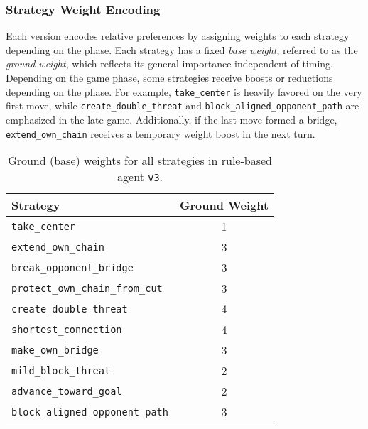 \documentclass[conference]{IEEEtran}
\begin{document}
\subsubsection{Strategy Weight Encoding}
Each version encodes relative preferences by assigning weights to each strategy depending on the phase. Each strategy has a fixed \textit{base weight}, referred to as the \textit{ground weight}, which reflects its general importance independent of timing. \\
Depending on the game phase, some strategies receive boosts or reductions depending on the phase. For example, \texttt{take\_center} is heavily favored on the very first move, while \texttt{create\_double\_threat} and \texttt{block\_aligned\_opponent\_path} are emphasized in the late game. Additionally, if the last move formed a bridge, \texttt{extend\_own\_chain} receives a temporary weight boost in the next turn.
\begin{table}[htbp]
\caption{Ground (base) weights for all strategies in rule-based agent \texttt{v3}.}
\begin{center}
\begin{tabular}{|l|c|}
\hline
\textbf{Strategy} & \textbf{Ground Weight} \\
\hline
\texttt{take\_center}                   & 1  \\
\texttt{extend\_own\_chain}             & 3  \\
\texttt{break\_opponent\_bridge}        & 3  \\
\texttt{protect\_own\_chain\_from\_cut} & 3  \\
\texttt{create\_double\_threat}         & 4  \\
\texttt{shortest\_connection}           & 4  \\
\texttt{make\_own\_bridge}              & 3  \\
\texttt{mild\_block\_threat}            & 2  \\
\texttt{advance\_toward\_goal}          & 2  \\
\texttt{block\_aligned\_opponent\_path} & 3  \\
\hline
\end{tabular}
\label{tab:ground_weights}
\end{center}
\end{table}
\end{document}
